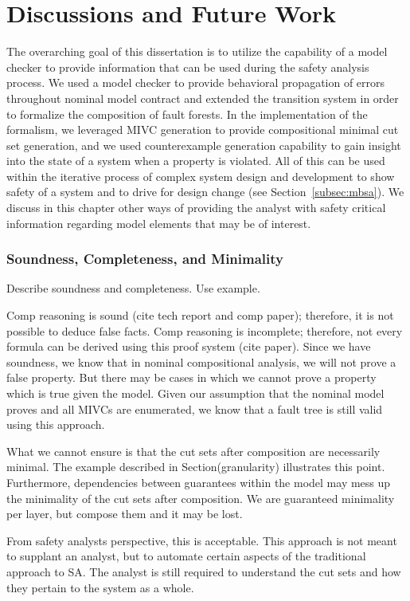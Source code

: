 \chapter{Discussions and Future Work}
\label{ch:discussion}
The overarching goal of this dissertation is to utilize the capability of a model checker to provide information that can be used during the safety analysis process. We used a model checker to provide behavioral propagation of errors throughout nominal model contract and extended the transition system in order to formalize the composition of fault forests. In the implementation of the formalism, we leveraged MIVC generation to provide compositional minimal cut set generation, and we used counterexample generation capability to gain insight into the state of a system when a property is violated. All of this can be used within the iterative process of complex system design and development to show safety of a system and to drive for design change (see Section~\ref{subsec:mbsa}). We discuss in this chapter other ways of providing the analyst with safety critical information regarding model elements that may be of interest. 

\subsection{Soundness, Completeness, and Minimality}
Describe soundness and completeness. Use example. 

Comp reasoning is sound (cite tech report and comp paper); therefore, it is not possible to deduce false facts. Comp reasoning is incomplete; therefore, not every formula can be derived using this proof system (cite paper). Since we have soundness, we know that in nominal compositional analysis, we will not prove a false property. But there may be cases in which we cannot prove a property which is true given the model. Given our assumption that the nominal model proves and all MIVCs are enumerated, we know that a fault tree is still valid using this approach. 

What we cannot ensure is that the cut sets after composition are necessarily minimal. The example described in Section(granularity) illustrates this point. Furthermore, dependencies between guarantees within the model may mess up the minimality of the cut sets after composition. We are guaranteed minimality per layer, but compose them and it may be lost. 

From safety analysts perspective, this is acceptable. This approach is not meant to supplant an analyst, but to automate certain aspects of the traditional approach to SA. The analyst is still required to understand the cut sets and how they pertain to the system as a whole. 

